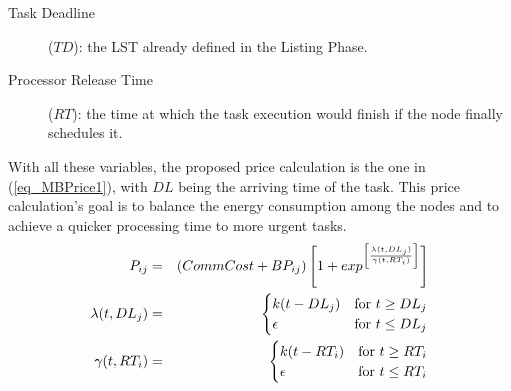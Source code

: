\begin{enumerate}
\begin{description}
\item[Task Deadline] ($ TD $): the LST already defined in the Listing Phase.

\item[Processor Release Time] ($ RT $): the time at which the task execution would finish if the node finally schedules it.
\end{description}

With all these variables, the proposed price calculation is the one in (\ref{eq_MBPrice1}), with $DL$ being the arriving time of the task. This price calculation's goal is to balance the energy consumption among the nodes and to achieve a quicker processing time to more urgent tasks.
\begin{eqnarray}
\label{eq_MBPrice1}
P_{ij} &=& (CommCost + BP_{ij})\left[1+exp^{\left[\frac{\lambda(t,DL_j)}{\gamma(t,RT_i)}\right]}\right]\\\vspace{0.5cm}
\lambda(t,DL_j) &=& \begin{cases}
             k(t - DL_j) &  \mathrm{for ~} t \geq DL_j \\
             \epsilon &  \mathrm{for ~} t \leq DL_j\end{cases}\\\vspace{0.5cm}   
\gamma(t,RT_i) &=& \begin{cases}
             k(t - RT_i) &  \mathrm{for ~} t \geq RT_i \\
             \epsilon &  \mathrm{for ~} t \leq RT_i\end{cases}
\end{eqnarray}
%
%

\end{enumerate}
